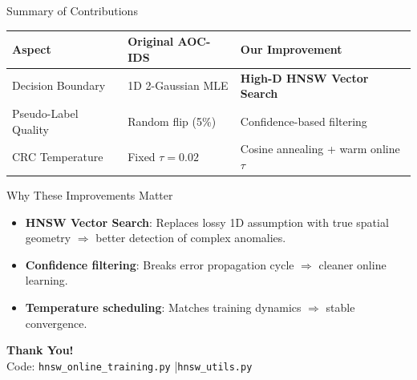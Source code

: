 \documentclass[aspectratio=169]{beamer}
\begin{document}
\begin{frame}{Summary of Contributions}
    \begin{table}[h]
        \centering
        \renewcommand{\arraystretch}{1.3}
        \begin{tabular}{@{}lll@{}}
            \toprule
            \textbf{Aspect} & \textbf{Original AOC-IDS} & \textbf{Our Improvement} \\
            \midrule
            Decision Boundary & 1D 2-Gaussian MLE & \textbf{High-D HNSW Vector Search} \\
            Pseudo-Label Quality & Random flip (5\%) & Confidence-based filtering \\
            CRC Temperature & Fixed $\tau = 0.02$ & Cosine annealing + warm online $\tau$ \\
            \bottomrule
        \end{tabular}
    \end{table}

    \vspace{0.4cm}

    \begin{block}{Why These Improvements Matter}
        \begin{itemize}
            \item \textbf{HNSW Vector Search}: Replaces lossy 1D assumption with true spatial geometry $\Rightarrow$ better detection of complex anomalies.
            \item \textbf{Confidence filtering}: Breaks error propagation cycle $\Rightarrow$ cleaner online learning.
            \item \textbf{Temperature scheduling}: Matches training dynamics $\Rightarrow$ stable convergence.
        \end{itemize}
    \end{block}

    \vspace{0.3cm}
    \centering
    {\large\textbf{Thank You!}}\\[0.2cm]
    {\footnotesize Code: \texttt{hnsw\_online\_training.py} \quad|\quad \texttt{hnsw\_utils.py}}
\end{frame}
\end{document}
